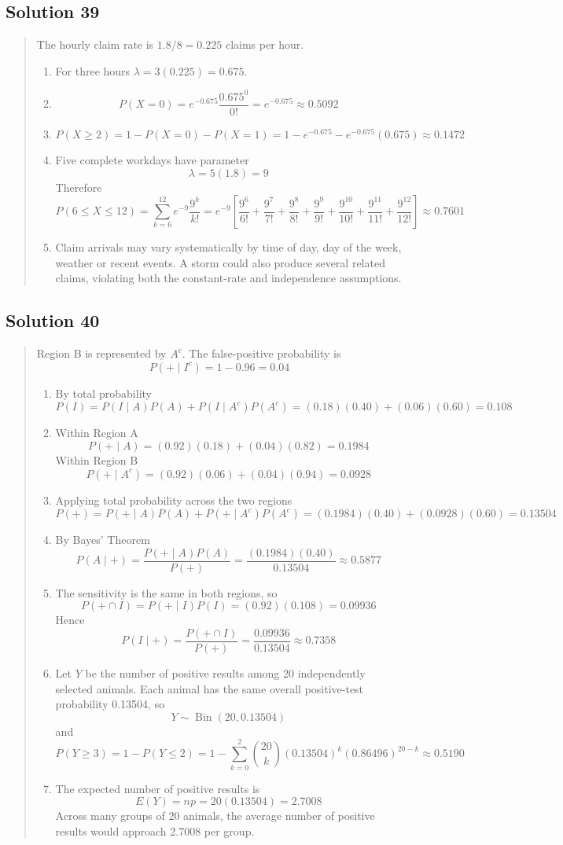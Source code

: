 \documentclass[10pt,letterpaper]{article}
\newcommand{\solutionheading}[1]{%
  \subsection*{Solution #1}
}
\newenvironment{answer}{%
  \begin{quote}\small\color{black}
}{%
  \end{quote}
}
\begin{document}
\solutionheading{39}
\begin{answer}
The hourly claim rate is $1.8/8=0.225$ claims per hour.
\begin{enumerate}
	\item For three hours $\lambda=3(0.225)=0.675$.
	\item
	$$P(X=0)=e^{-0.675}\frac{0.675^0}{0!}=e^{-0.675}\approx0.5092$$
	\item
	$$P(X\geq2)=1-P(X=0)-P(X=1)=1-e^{-0.675}-e^{-0.675}(0.675)\approx0.1472$$
	\item Five complete workdays have parameter
	$$\lambda=5(1.8)=9$$
  	Therefore
	$$P(6\leq X\leq12)=\sum_{k=6}^{12}e^{-9}\frac{9^k}{k!}=e^{-9}\left[\frac{9^6}{6!} + \frac{9^7}{7!} + \frac{9^8}{8!} + \frac{9^9}{9!} + \frac{9^{10}}{10!} + \frac{9^{11}}{11!} + \frac{9^{12}}{12!}\right]\approx0.7601$$
	\item Claim arrivals may vary systematically by time of day, day of the week, weather or recent events. A storm could also produce several related claims, violating both the constant-rate and independence assumptions.
\end{enumerate}
\end{answer}

\solutionheading{40}
\begin{answer}
Region B is represented by $A^c$. The false-positive probability is
$$P(+\mid I^c)=1-0.96=0.04$$

\begin{enumerate}
	\item By total probability
	$$P(I)=P(I\mid A)P(A)+P(I\mid A^c)P(A^c)=(0.18)(0.40)+(0.06)(0.60)=0.108$$
	\item Within Region A
	$$P(+\mid A)=(0.92)(0.18)+(0.04)(0.82)=0.1984$$
  	Within Region B
	$$P(+\mid A^c)=(0.92)(0.06)+(0.04)(0.94)=0.0928$$
	\item Applying total probability across the two regions
	$$P(+)=P(+\mid A)P(A)+P(+\mid A^c)P(A^c)=(0.1984)(0.40)+(0.0928)(0.60)=0.13504$$
	\item By Bayes' Theorem
	$$P(A\mid+)=\frac{P(+\mid A)P(A)}{P(+)}=\frac{(0.1984)(0.40)}{0.13504}\approx0.5877$$
	\item The sensitivity is the same in both regions, so
	$$P(+\cap I)=P(+\mid I)P(I)=(0.92)(0.108)=0.09936$$
  	Hence
	$$P(I\mid+)=\frac{P(+\cap I)}{P(+)}=\frac{0.09936}{0.13504}\approx0.7358$$
  	\item Let $Y$ be the number of positive results among 20 independently selected animals. Each animal has the same overall positive-test probability 0.13504, so
	$$Y\sim\operatorname{Bin}(20,0.13504)$$
  	and
	$$P(Y\geq3)=1-P(Y\leq2)=1-\sum_{k=0}^{2}\binom{20}{k}(0.13504)^k(0.86496)^{20-k}\approx0.5190$$
  	\item The expected number of positive results is
	$$E(Y)=np=20(0.13504)=2.7008$$
 	Across many groups of 20 animals, the average number of positive results would approach 2.7008 per group.
\end{enumerate}
\end{answer}
\end{document}
